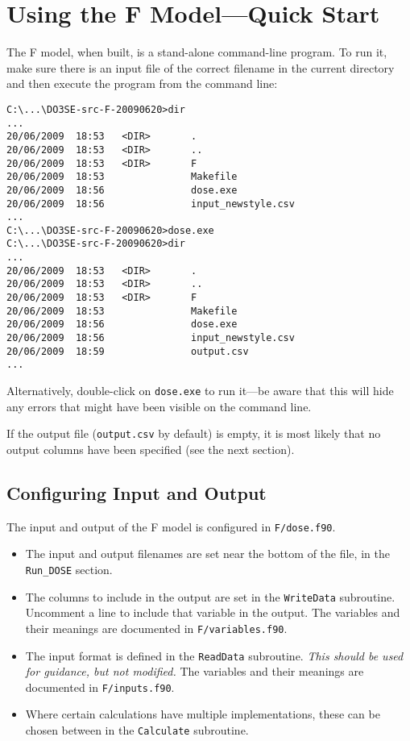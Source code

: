 \section{Using the F Model---Quick Start}

The F model, when built, is a stand-alone command-line program.  To run it, make sure there is an 
input file of the correct filename in the current directory and then execute the program from the 
command line:
\begin{lstlisting}
C:\...\DO3SE-src-F-20090620>dir
...
20/06/2009  18:53   <DIR>       .
20/06/2009  18:53   <DIR>       ..
20/06/2009  18:53   <DIR>       F
20/06/2009  18:53               Makefile
20/06/2009  18:56               dose.exe
20/06/2009  18:56               input_newstyle.csv
...
C:\...\DO3SE-src-F-20090620>dose.exe
C:\...\DO3SE-src-F-20090620>dir
...
20/06/2009  18:53   <DIR>       .
20/06/2009  18:53   <DIR>       ..
20/06/2009  18:53   <DIR>       F
20/06/2009  18:53               Makefile
20/06/2009  18:56               dose.exe
20/06/2009  18:56               input_newstyle.csv
20/06/2009  18:59               output.csv
...
\end{lstlisting}

Alternatively, double-click on \verb|dose.exe| to run it---be aware that this will hide any errors 
that might have been visible on the command line.

If the output file (\verb|output.csv| by default) is empty, it is most likely that no output columns 
have been specified (see the next section).

\subsection{Configuring Input and Output}

The input and output of the F model is configured in \verb|F/dose.f90|.

\begin{itemize}

\item The input and output filenames are set near the bottom of the file, in the \verb|Run_DOSE| 
section.

\item The columns to include in the output are set in the \verb|WriteData| subroutine.  Uncomment a 
line to include that variable in the output.  The variables and their meanings are documented in 
\verb|F/variables.f90|.

\item The input format is defined in the \verb|ReadData| subroutine.  \emph{This should be used for 
guidance, but not modified.}  The variables and their meanings are documented in 
\verb|F/inputs.f90|.

\item Where certain calculations have multiple implementations, these can be chosen between in the 
\verb|Calculate| subroutine.

\end{itemize}

